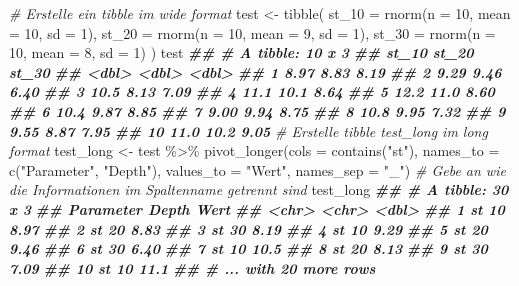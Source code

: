 \documentclass[
]{article}
\newenvironment{Shaded}{\begin{snugshade}}{\end{snugshade}}
\newcommand{\AttributeTok}[1]{\textcolor[rgb]{0.77,0.63,0.00}{#1}}
\newcommand{\CommentTok}[1]{\textcolor[rgb]{0.56,0.35,0.01}{\textit{#1}}}
\newcommand{\DecValTok}[1]{\textcolor[rgb]{0.00,0.00,0.81}{#1}}
\newcommand{\DocumentationTok}[1]{\textcolor[rgb]{0.56,0.35,0.01}{\textbf{\textit{#1}}}}
\newcommand{\FunctionTok}[1]{\textcolor[rgb]{0.00,0.00,0.00}{#1}}
\newcommand{\NormalTok}[1]{#1}
\newcommand{\OtherTok}[1]{\textcolor[rgb]{0.56,0.35,0.01}{#1}}
\newcommand{\SpecialCharTok}[1]{\textcolor[rgb]{0.00,0.00,0.00}{#1}}
\newcommand{\StringTok}[1]{\textcolor[rgb]{0.31,0.60,0.02}{#1}}
\begin{document}
\begin{Shaded}
\begin{Highlighting}[]
\CommentTok{\# Erstelle ein tibble im wide format}
\NormalTok{test }\OtherTok{\textless{}{-}} \FunctionTok{tibble}\NormalTok{(}
  \AttributeTok{st\_10 =} \FunctionTok{rnorm}\NormalTok{(}\AttributeTok{n =} \DecValTok{10}\NormalTok{, }\AttributeTok{mean =} \DecValTok{10}\NormalTok{, }\AttributeTok{sd =} \DecValTok{1}\NormalTok{), }
  \AttributeTok{st\_20 =} \FunctionTok{rnorm}\NormalTok{(}\AttributeTok{n =} \DecValTok{10}\NormalTok{, }\AttributeTok{mean =} \DecValTok{9}\NormalTok{, }\AttributeTok{sd =} \DecValTok{1}\NormalTok{), }
  \AttributeTok{st\_30 =} \FunctionTok{rnorm}\NormalTok{(}\AttributeTok{n =} \DecValTok{10}\NormalTok{, }\AttributeTok{mean =} \DecValTok{8}\NormalTok{, }\AttributeTok{sd =} \DecValTok{1}\NormalTok{) }
\NormalTok{)}
\NormalTok{test}
\DocumentationTok{\#\# \# A tibble: 10 x 3}
\DocumentationTok{\#\#    st\_10 st\_20 st\_30}
\DocumentationTok{\#\#    \textless{}dbl\textgreater{} \textless{}dbl\textgreater{} \textless{}dbl\textgreater{}}
\DocumentationTok{\#\#  1  8.97  8.83  8.19}
\DocumentationTok{\#\#  2  9.29  9.46  6.40}
\DocumentationTok{\#\#  3 10.5   8.13  7.09}
\DocumentationTok{\#\#  4 11.1  10.1   8.64}
\DocumentationTok{\#\#  5 12.2  11.0   8.60}
\DocumentationTok{\#\#  6 10.4   9.87  8.85}
\DocumentationTok{\#\#  7  9.00  9.94  8.75}
\DocumentationTok{\#\#  8 10.8   9.95  7.32}
\DocumentationTok{\#\#  9  9.55  8.87  7.95}
\DocumentationTok{\#\# 10 11.0  10.2   9.05}
\CommentTok{\# Erstelle tibble test\_long im long format}
\NormalTok{test\_long }\OtherTok{\textless{}{-}}\NormalTok{ test }\SpecialCharTok{\%\textgreater{}\%}
  \FunctionTok{pivot\_longer}\NormalTok{(}\AttributeTok{cols =} \FunctionTok{contains}\NormalTok{(}\StringTok{"st"}\NormalTok{), }\AttributeTok{names\_to =} \FunctionTok{c}\NormalTok{(}\StringTok{"Parameter"}\NormalTok{, }\StringTok{"Depth"}\NormalTok{), }\AttributeTok{values\_to =} \StringTok{"Wert"}\NormalTok{, }\AttributeTok{names\_sep =} \StringTok{"\_"}\NormalTok{) }\CommentTok{\# Gebe an wie die Informationen im Spaltenname getrennt sind}
\NormalTok{test\_long}
\DocumentationTok{\#\# \# A tibble: 30 x 3}
\DocumentationTok{\#\#    Parameter Depth  Wert}
\DocumentationTok{\#\#    \textless{}chr\textgreater{}     \textless{}chr\textgreater{} \textless{}dbl\textgreater{}}
\DocumentationTok{\#\#  1 st        10     8.97}
\DocumentationTok{\#\#  2 st        20     8.83}
\DocumentationTok{\#\#  3 st        30     8.19}
\DocumentationTok{\#\#  4 st        10     9.29}
\DocumentationTok{\#\#  5 st        20     9.46}
\DocumentationTok{\#\#  6 st        30     6.40}
\DocumentationTok{\#\#  7 st        10    10.5 }
\DocumentationTok{\#\#  8 st        20     8.13}
\DocumentationTok{\#\#  9 st        30     7.09}
\DocumentationTok{\#\# 10 st        10    11.1 }
\DocumentationTok{\#\# \# ... with 20 more rows}
\end{Highlighting}
\end{Shaded}
\end{document}
